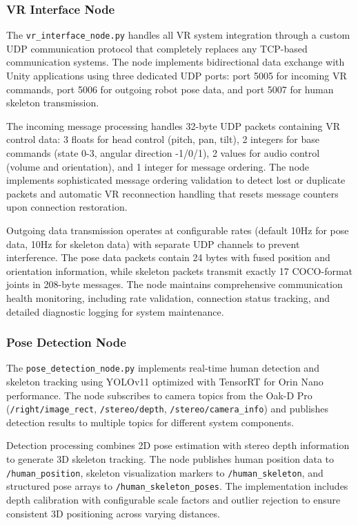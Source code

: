 \subsubsection{VR Interface Node}

The \texttt{vr\_interface\_node.py} handles all VR system integration through a custom UDP communication protocol that completely replaces any TCP-based communication systems. The node implements bidirectional data exchange with Unity applications using three dedicated UDP ports: port 5005 for incoming VR commands, port 5006 for outgoing robot pose data, and port 5007 for human skeleton transmission.

The incoming message processing handles 32-byte UDP packets containing VR control data: 3 floats for head control (pitch, pan, tilt), 2 integers for base commands (state 0-3, angular direction -1/0/1), 2 values for audio control (volume and orientation), and 1 integer for message ordering. The node implements sophisticated message ordering validation to detect lost or duplicate packets and automatic VR reconnection handling that resets message counters upon connection restoration.

Outgoing data transmission operates at configurable rates (default 10Hz for pose data, 10Hz for skeleton data) with separate UDP channels to prevent interference. The pose data packets contain 24 bytes with fused position and orientation information, while skeleton packets transmit exactly 17 COCO-format joints in 208-byte messages. The node maintains comprehensive communication health monitoring, including rate validation, connection status tracking, and detailed diagnostic logging for system maintenance.

\subsubsection{Pose Detection Node}

The \texttt{pose\_detection\_node.py} implements real-time human detection and skeleton tracking using YOLOv11 optimized with TensorRT for Orin Nano performance. The node subscribes to camera topics from the Oak-D Pro (\texttt{/right/image\_rect}, \texttt{/stereo/depth}, \texttt{/stereo/camera\_info}) and publishes detection results to multiple topics for different system components.

Detection processing combines 2D pose estimation with stereo depth information to generate 3D skeleton tracking. The node publishes human position data to \texttt{/human\_position}, skeleton visualization markers to \texttt{/human\_skeleton}, and structured pose arrays to \texttt{/human\_skeleton\_poses}. The implementation includes depth calibration with configurable scale factors and outlier rejection to ensure consistent 3D positioning across varying distances.

